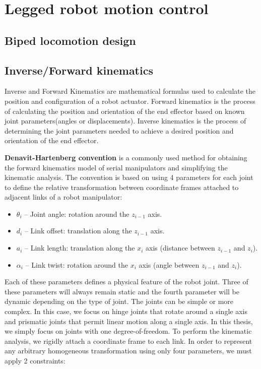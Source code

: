 \section{Legged robot motion control}
\subsection{Biped locomotion design}
\subsection{Inverse/Forward kinematics}
Inverse and Forward Kinematics are mathematical formulas used to calculate the position and configuration of a robot actuator. Forward kinematics is the process of calculating the position and orientation of the end effector based on known joint parameters(angles or displacements). Inverse kinematics is the process of determining the joint parameters needed to achieve a desired position and orientation of the end effector. 

\textbf{Denavit-Hartenberg convention} is a commonly used method for obtaining the forward kinematics model of serial manipulators and simplifying the kinematic analysis. The convention is based on using 4 parameters for each joint to define the relative transformation between coordinate frames attached to adjacent links of a robot manipulator:
\begin{itemize}
  \item \textbf{\( \theta_i \)} -- Joint angle: rotation around the \( z_{i-1} \) axis.
  \item \textbf{\( d_i \)} -- Link offset: translation along the \( z_{i-1} \) axis.
  \item \textbf{\( a_i \)} -- Link length: translation along the \( x_i \) axis (distance between \( z_{i-1} \) and \( z_i \)).
  \item \textbf{\( \alpha_i \)} -- Link twist: rotation around the \( x_i \) axis (angle between \( z_{i-1} \) and \( z_i \)).
\end{itemize}

Each of these parameters defines a physical feature of the robot joint. Three of these parameters will always remain static and the fourth parameter will be dynamic depending on the type of joint. The joints can be simple or more complex. In this case, we focus on hinge joints that rotate around a single axis and prismatic joints that permit linear motion along a single axis. In this thesis, we simply focus on joints with one degree-of-freedom.
To perform the kinematic analysis, we rigidly attach a coordinate frame to each link. In order to represent any arbitrary homogeneous transformation using only four parameters, we must apply 2 constraints:

